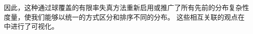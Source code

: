 \documentclass[../../book-main_zh.tex]{subfiles}
\begin{document}
\begin{remark}
	因此，这种通过球覆盖的有限率失真方法重新启用或推广了所有先前的分布复杂性度量，使我们能够以统一的方式区分和排序不同的分布。
	这些相互关联的观点在  中进行了可视化。
\end{remark}




%
%
%
%
%
\end{document}
